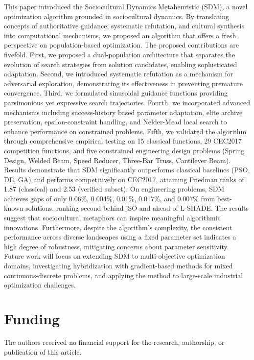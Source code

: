 \documentclass[11pt]{article}
\begin{document}
This paper introduced the Sociocultural Dynamics Metaheuristic (SDM), a novel optimization algorithm grounded in sociocultural dynamics. By translating concepts of authoritative guidance, systematic refutation, and cultural synthesis into computational mechanisms, we proposed an algorithm that offers a fresh perspective on population-based optimization.
The proposed contributions are fivefold. First, we proposed a dual-population architecture that separates the evolution of search strategies from solution candidates, enabling sophisticated adaptation. Second, we introduced systematic refutation as a mechanism for adversarial exploration, demonstrating its effectiveness in preventing premature convergence. Third, we formulated sinusoidal guidance functions providing parsimonious yet expressive search trajectories. Fourth, we incorporated advanced mechanisms including success-history based parameter adaptation, elite archive preservation, epsilon-constraint handling, and Nelder-Mead local search to enhance performance on constrained problems. Fifth, we validated the algorithm through comprehensive empirical testing on 15 classical functions, 29 CEC2017 competition functions, and five constrained engineering design problems (Spring Design, Welded Beam, Speed Reducer, Three-Bar Truss, Cantilever Beam). Results demonstrate that SDM significantly outperforms classical baselines (PSO, DE, GA) and performs competitively on CEC2017, attaining Friedman ranks of 1.87 (classical) and 2.53 (verified subset). On engineering problems, SDM achieves gaps of only 0.06\%, 0.004\%, 0.01\%, 0.017\%, and 0.007\% from best-known solutions, ranking second behind jSO and ahead of L-SHADE.
The results suggest that sociocultural metaphors can inspire meaningful algorithmic innovations. Furthermore, despite the algorithm's complexity, the consistent performance across diverse landscapes using a fixed parameter set indicates a high degree of robustness, mitigating concerns about parameter sensitivity. Future work will focus on extending SDM to multi-objective optimization domains, investigating hybridization with gradient-based methods for mixed continuous-discrete problems, and applying the method to large-scale industrial optimization challenges.

\section*{Funding}
The authors received no financial support for the research, authorship, or publication of this article.
\end{document}
